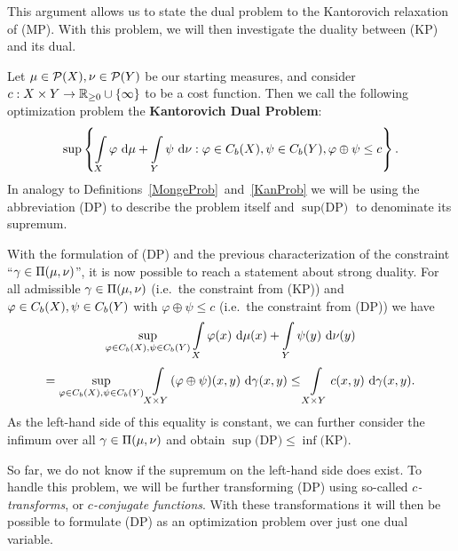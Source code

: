 This argument allows us to state the dual problem to the Kantorovich relaxation of (MP). With this problem, we will then investigate the duality between (KP) and its dual.

\begin{definition}\label{DualProb}
	Let $\mu \in \PM{X}, \nu \in \PM{Y}$ be our starting measures, and consider $\map[c]{X \times Y}{\RZero{} \cup{} \{ \infty \}}$ to be a cost function. Then we call the following optimization problem the \textbf{Kantorovich Dual Problem}:
	\[ \sup \left\{ \int\limits_{X} \varphi~\D + \int\limits_{Y} \psi~\D[\nu] : \varphi \in \CF[b]{X}, \psi \in \CF[b]{Y}, \varphi \oplus \psi \le c \right\}. \]
	In analogy to Definitions~\ref{MongeProb}~and~\ref{KanProb} we will be using the abbreviation (DP) to describe the problem itself and $\sup \text{(DP)}$ to denominate its supremum.
\end{definition}

With the formulation of (DP) and the previous characterization of the constraint ``$\gamma \in \TP{\mu}{\nu}$'', it is now possible to reach a statement about strong duality. For all admissible $\gamma \in \TP{\mu}{\nu}$ (i.e.~the constraint from (KP)) and $\varphi \in \CF[b]{X}, \psi \in \CF[b]{Y}$ with $\varphi \oplus \psi \le c$ (i.e.~the constraint from (DP)) we have
\[ \sup\limits_{\varphi \in \CF[b]{X}, \psi \in \CF[b]{Y}} \int\limits_{X} \varphi(x)~\Dx{\mu} + \int\limits_{Y} \psi(y)~\Dx[y]{\nu} \]
\[ = \sup\limits_{\varphi \in \CF[b]{X}, \psi \in \CF[b]{Y}} \int\limits_{X \times Y} (\varphi \oplus \psi)(x, y)~\Dx[x, y]{\gamma} \le \int\limits_{X \times Y} c(x, y)~\Dx[x, y]{\gamma}. \]
As the left-hand side of this equality is constant, we can further consider the infimum over all $\gamma \in \TP{\mu}{\nu}$ and obtain $\sup \text{(DP)} \le \inf \text{(KP)}$.

So far, we do not know if the supremum on the left-hand side does exist. To handle this problem, we will be further transforming (DP) using so-called \textit{$c$-transforms}, or \textit{$c$-conjugate functions}. With these transformations it will then be possible to formulate (DP) as an optimization problem over just one dual variable.

